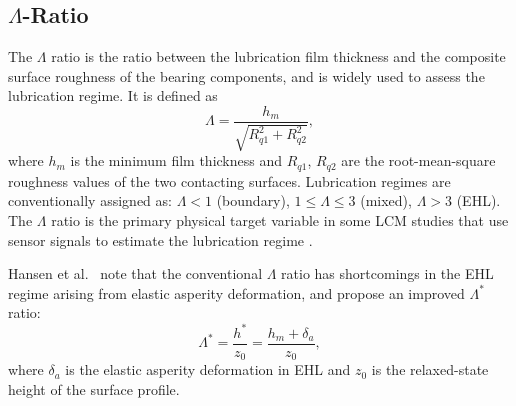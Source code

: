 \subsection{$\Lambda$-Ratio}
\label{subsec:lambda}
The $\Lambda$ ratio is the ratio between the lubrication film thickness and the composite surface roughness of the bearing components, and is widely used to assess the lubrication regime. It is defined as
\begin{equation}
\Lambda = \frac{h_{m}}{\sqrt{R_{q1}^2 + R_{q2}^2}},
\end{equation}
where $h_{m}$ is the minimum film thickness and $R_{q1}$, $R_{q2}$ are the root-mean-square roughness values of the two contacting surfaces. Lubrication regimes are conventionally assigned as: $\Lambda < 1$ (boundary), $1 \leq \Lambda \leq 3$ (mixed), $\Lambda > 3$ (EHL). The $\Lambda$ ratio is the primary physical target variable in some LCM studies that use sensor signals to estimate the lubrication regime \cite{jakobsen_detecting_2023,hou_-situ_2025,cornel_condition_2021}.

Hansen et al.\ \cite{hansen_new_2021} note that the conventional $\Lambda$ ratio has shortcomings in the EHL regime arising from elastic asperity deformation, and propose an improved $\Lambda^*$ ratio:
\begin{equation}
\Lambda^* = \frac{h^*}{z_0} = \frac{h_m+\delta_a}{z_0},
\end{equation}
where $\delta_a$ is the elastic asperity deformation in EHL and $z_0$ is the relaxed-state height of the surface profile.


